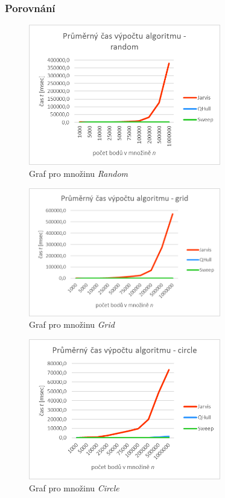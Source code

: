 \documentclass[a4paper, 12pt]{article}
\begin{document}
\subsubsection{Porovnání}
\begin{figure}[h!]
	\centering
	\includegraphics[width=8.4cm]{./pictures/g_rand_all.png}
	\caption{Graf pro množinu \textit{Random}}
\end{figure}

\begin{figure}[h!]
	\centering
	\includegraphics[width=8.4cm]{./pictures/g_grid_all.png}
	\caption{Graf pro množinu \textit{Grid}}
\end{figure}

\begin{figure}[h!]
	\centering
	\includegraphics[width=8.4cm]{./pictures/g_circ_all.png}
	\caption{Graf pro množinu \textit{Circle}}
\end{figure}
\end{document}
